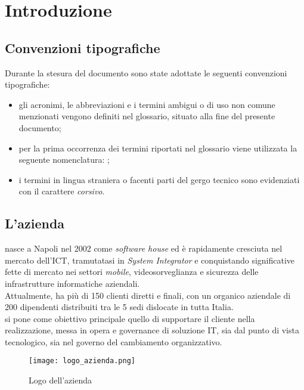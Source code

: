 
\chapter{Introduzione}
\label{cap:introduzione}
\section{Convenzioni tipografiche}
\label{sec:convenzioni tipografiche}
Durante la stesura del documento sono state adottate le seguenti convenzioni tipografiche:
\begin{itemize}
	\item gli acronimi, le abbreviazioni e i termini ambigui o di uso non comune menzionati vengono definiti nel glossario, situato alla fine del presente documento;
	\item per la prima occorrenza dei termini riportati nel glossario viene utilizzata la seguente nomenclatura: {\color{RoyalBlue}{parola\glsfirstoccur}};
	\item i termini in lingua straniera o facenti parti del gergo tecnico sono evidenziati con il carattere \emph{corsivo}.
\end{itemize}


\section{L'azienda}

\myCompany\xspace nasce a Napoli nel 2002 come \textit{software house} ed è rapidamente cresciuta nel
mercato dell'\gls{ICT}, tramutatasi in \textit{System Integrator} e conquistando significative fette di mercato nei settori 
\textit{mobile}, videosorveglianza e sicurezza delle infrastrutture informatiche aziendali. \\
Attualmente, \myCompany ha più di 150 clienti diretti e finali, con un organico aziendale
 di 200 dipendenti distribuiti tra le 5 sedi dislocate in tutta Italia.\\
\myCompany\xspace si pone come obiettivo principale quello di supportare il cliente nella realizzazione,
messa in opera e governance di soluzione IT, sia dal punto di vista tecnologico,
sia nel governo del cambiamento organizzativo.
\begin{figure}[!h] 
    \centering 
    \texttt{[image: logo\_azienda.png]} 
    \caption{Logo dell'azienda}
\end{figure}

